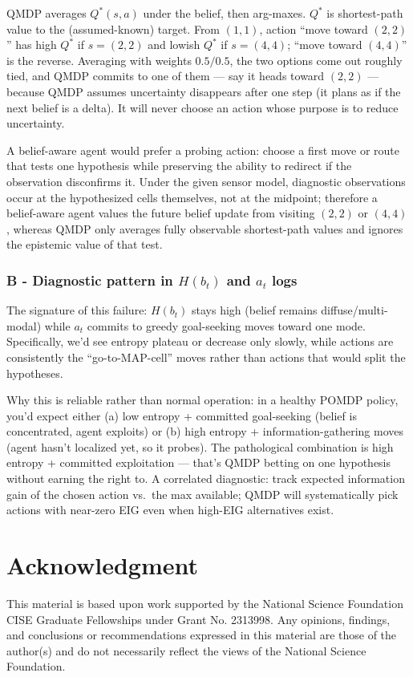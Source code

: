 \documentclass[conference]{IEEEtran}
\begin{document}
	QMDP averages $Q^*(s,a)$ under the belief, then arg-maxes. $Q^*$ is shortest-path value to the (assumed-known) target. From $(1,1)$, action ``move toward $(2,2)$'' has high $Q^*$ if $s=(2,2)$ and lowish $Q^*$ if $s=(4,4)$; ``move toward $(4,4)$'' is the reverse. Averaging with weights $0.5/0.5$, the two options come out roughly tied, and QMDP commits to one of them --- say it heads toward $(2,2)$ --- because QMDP assumes uncertainty disappears after one step (it plans as if the next belief is a delta). It will never choose an action whose purpose is to reduce uncertainty.
	
	A belief-aware agent would prefer a probing action:
    choose a first move or route that tests one hypothesis while preserving the ability to redirect if the observation disconfirms it. Under the given sensor model, diagnostic observations occur at the hypothesized cells themselves, not at the midpoint; therefore a belief-aware agent values the future belief update from visiting $(2,2)$ or $(4,4)$, whereas QMDP only averages fully observable shortest-path values and ignores the epistemic value of that test.
	
	\subsubsection{B - Diagnostic pattern in $H(b_t)$ and $a_t$ logs}
	
	The signature of this failure: $H(b_t)$ stays high (belief remains diffuse/multi-modal) while $a_t$ commits to greedy goal-seeking moves toward one mode. Specifically, we'd see entropy plateau or decrease only slowly, while actions are consistently the ``go-to-MAP-cell'' moves rather than actions that would split the hypotheses.
	
	Why this is reliable rather than normal operation: in a healthy POMDP policy, you'd expect either (a) low entropy + committed goal-seeking (belief is concentrated, agent exploits) or (b) high entropy + information-gathering moves (agent hasn't localized yet, so it probes). The pathological combination is high entropy + committed exploitation --- that's QMDP betting on one hypothesis without earning the right to. A correlated diagnostic: track expected information gain of the chosen action vs.\ the max available; QMDP will systematically pick actions with near-zero EIG even when high-EIG alternatives exist.
	
	
	\section*{Acknowledgment}
	
	This material is based upon work supported by the National Science Foundation CISE Graduate
	Fellowships under Grant No. 2313998. Any opinions, findings, and conclusions or
	recommendations expressed in this material are those of the author(s) and do not necessarily
	reflect the views of the National Science Foundation.
	
\end{document}
